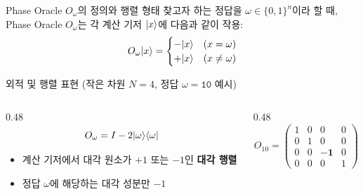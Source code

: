 \documentclass[aspectratio=169, 10pt]{beamer}
\begin{document}
\begin{frame}{Phase Oracle $O_\omega$의 정의와 행렬 형태}
    찾고자 하는 정답을 $\omega \in \{0,1\}^n$이라 할 때, Phase Oracle $O_\omega$는 각 계산 기저 $|x\rangle$에 다음과 같이 작용:
    $$O_\omega |x\rangle = \begin{cases} -|x\rangle & (x = \omega) \\ +|x\rangle & (x \neq \omega) \end{cases}$$
    \pause
    \vspace{0.1cm}
    \begin{qcblock}{외적 및 행렬 표현 (작은 차원 $N=4$, 정답 $\omega=\texttt{10}$ 예시)}
        \begin{columns}[c]
            \begin{column}{0.48\textwidth}
                $$O_\omega = I - 2|\omega\rangle\langle\omega|$$
                \begin{itemize}
                    \item 계산 기저에서 대각 원소가 $+1$ 또는 $-1$인 \textbf{대각 행렬}
                    \pause
                    \item 정답 $\omega$에 해당하는 대각 성분만 $-1$
                \end{itemize}
            \end{column}
            \begin{column}{0.48\textwidth}
                $$O_{10} = \begin{pmatrix} 1 & 0 & 0 & 0 \\ 0 & 1 & 0 & 0 \\ 0 & 0 & \mathbf{-1} & 0 \\ 0 & 0 & 0 & 1 \end{pmatrix}$$
            \end{column}
        \end{columns}
    \end{qcblock}
\end{frame}
\end{document}
